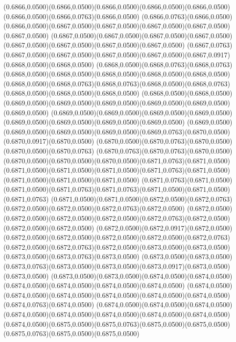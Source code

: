 (0.6866,0.0500)(0.6866,0.0500)(0.6866,0.0500)(0.6866,0.0500)(0.6866,0.0500)(0.6866,0.0500)(0.6866,0.0763)(0.6866,0.0500)
(0.6866,0.0763)(0.6866,0.0500)(0.6866,0.0500)(0.6867,0.0500)(0.6867,0.0500)(0.6867,0.0500)(0.6867,0.0500)(0.6867,0.0500)
(0.6867,0.0500)(0.6867,0.0500)(0.6867,0.0500)(0.6867,0.0500)(0.6867,0.0500)(0.6867,0.0500)(0.6867,0.0500)(0.6867,0.0500)
(0.6867,0.0763)(0.6867,0.0500)(0.6867,0.0500)(0.6867,0.0500)(0.6867,0.0500)(0.6867,0.0917)(0.6868,0.0500)(0.6868,0.0500)
(0.6868,0.0500)(0.6868,0.0763)(0.6868,0.0763)(0.6868,0.0500)(0.6868,0.0500)(0.6868,0.0500)(0.6868,0.0500)(0.6868,0.0500)
(0.6868,0.0500)(0.6868,0.0763)(0.6868,0.0763)(0.6868,0.0500)(0.6868,0.0763)(0.6868,0.0500)(0.6868,0.0500)(0.6868,0.0500)
(0.6868,0.0500)(0.6868,0.0500)(0.6869,0.0500)(0.6869,0.0500)(0.6869,0.0500)(0.6869,0.0500)(0.6869,0.0500)(0.6869,0.0500)
(0.6869,0.0500)(0.6869,0.0500)(0.6869,0.0500)(0.6869,0.0500)(0.6869,0.0500)(0.6869,0.0500)(0.6869,0.0500)(0.6869,0.0500)
(0.6869,0.0500)(0.6869,0.0500)(0.6869,0.0500)(0.6869,0.0500)(0.6869,0.0763)(0.6870,0.0500)(0.6870,0.0917)(0.6870,0.0500)
(0.6870,0.0500)(0.6870,0.0763)(0.6870,0.0500)(0.6870,0.0500)(0.6870,0.0763)
\PST@Solid(0.6870,0.0763)(0.6870,0.0763)(0.6870,0.0500)(0.6870,0.0500)(0.6870,0.0500)(0.6870,0.0500)(0.6871,0.0763)(0.6871,0.0500)
(0.6871,0.0500)(0.6871,0.0500)(0.6871,0.0500)(0.6871,0.0763)(0.6871,0.0500)(0.6871,0.0500)(0.6871,0.0500)(0.6871,0.0500)
(0.6871,0.0763)(0.6871,0.0500)(0.6871,0.0500)(0.6871,0.0763)(0.6871,0.0763)(0.6871,0.0500)(0.6871,0.0500)(0.6871,0.0763)
(0.6871,0.0500)(0.6871,0.0500)(0.6872,0.0500)(0.6872,0.0763)(0.6872,0.0500)(0.6872,0.0500)(0.6872,0.0763)(0.6872,0.0500)
(0.6872,0.0500)(0.6872,0.0500)(0.6872,0.0500)(0.6872,0.0500)(0.6872,0.0763)(0.6872,0.0500)(0.6872,0.0500)(0.6872,0.0500)
(0.6872,0.0500)(0.6872,0.0917)(0.6872,0.0500)(0.6872,0.0500)(0.6872,0.0500)(0.6872,0.0500)(0.6872,0.0500)(0.6872,0.0763)
(0.6872,0.0500)(0.6872,0.0763)(0.6872,0.0500)(0.6873,0.0500)(0.6873,0.0500)(0.6873,0.0500)(0.6873,0.0763)(0.6873,0.0500)
(0.6873,0.0500)(0.6873,0.0500)(0.6873,0.0763)(0.6873,0.0500)(0.6873,0.0500)(0.6873,0.0917)(0.6873,0.0500)(0.6873,0.0500)
(0.6873,0.0500)(0.6873,0.0500)(0.6874,0.0500)(0.6874,0.0500)(0.6874,0.0500)(0.6874,0.0500)(0.6874,0.0500)(0.6874,0.0500)
(0.6874,0.0500)(0.6874,0.0500)(0.6874,0.0500)(0.6874,0.0500)(0.6874,0.0500)(0.6874,0.0500)(0.6874,0.0763)(0.6874,0.0500)
(0.6874,0.0500)(0.6874,0.0500)(0.6874,0.0500)(0.6874,0.0500)(0.6874,0.0500)(0.6874,0.0500)(0.6874,0.0500)(0.6874,0.0500)
(0.6874,0.0500)(0.6875,0.0500)(0.6875,0.0763)(0.6875,0.0500)(0.6875,0.0500)(0.6875,0.0763)(0.6875,0.0500)(0.6875,0.0500)
